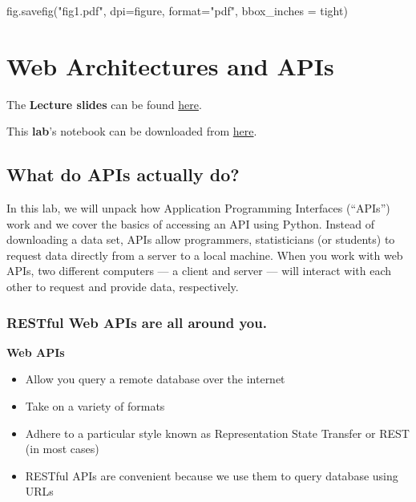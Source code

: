 \documentclass[
  letterpaper,
  DIV=11,
  numbers=noendperiod]{scrreprt}
\newenvironment{Shaded}{\begin{snugshade}}{\end{snugshade}}
\newcommand{\BuiltInTok}[1]{\textcolor[rgb]{0.00,0.23,0.31}{#1}}
\newcommand{\NormalTok}[1]{\textcolor[rgb]{0.00,0.23,0.31}{#1}}
\newcommand{\OperatorTok}[1]{\textcolor[rgb]{0.37,0.37,0.37}{#1}}
\newcommand{\StringTok}[1]{\textcolor[rgb]{0.13,0.47,0.30}{#1}}
\providecommand{\tightlist}{%
  \setlength{\itemsep}{0pt}\setlength{\parskip}{0pt}}\usepackage{longtable,booktabs,array}
\begin{document}
\begin{Shaded}
\begin{Highlighting}[]
\NormalTok{fig.savefig(}\StringTok{"fig1.pdf"}\NormalTok{, dpi}\OperatorTok{=}\StringTok{\textquotesingle{}figure\textquotesingle{}}\NormalTok{, }\BuiltInTok{format}\OperatorTok{=}\StringTok{"pdf"}\NormalTok{, bbox\_inches }\OperatorTok{=} \StringTok{\textquotesingle{}tight\textquotesingle{}}\NormalTok{)}
\end{Highlighting}
\end{Shaded}


\hypertarget{web-architectures-and-apis}{%
\chapter{Web Architectures and APIs}\label{web-architectures-and-apis}}

The \textbf{Lecture slides} can be found
\href{https://github.com/GDSL-UL/wma/raw/main/lectures/w03.pdf}{here}.

This \textbf{lab}'s notebook can be downloaded from
\href{https://github.com/GDSL-UL/wma/blob/main/labs/w03_webArch.ipynb}{here}.

\hypertarget{what-do-apis-actually-do}{%
\section{What do APIs actually do?}\label{what-do-apis-actually-do}}

In this lab, we will unpack how Application Programming Interfaces
(``APIs'') work and we cover the basics of accessing an API using
Python. Instead of downloading a data set, APIs allow programmers,
statisticians (or students) to request data directly from a server to a
local machine. When you work with web APIs, two different computers ---
a client and server --- will interact with each other to request and
provide data, respectively.

\hypertarget{restful-web-apis-are-all-around-you.}{%
\subsection{RESTful Web APIs are all around
you.}\label{restful-web-apis-are-all-around-you.}}

\textbf{Web APIs}

\begin{itemize}
\tightlist
\item
  Allow you query a remote database over the internet
\item
  Take on a variety of formats
\item
  Adhere to a particular style known as Representation State Transfer or
  REST (in most cases)
\item
  RESTful APIs are convenient because we use them to query database
  using URLs
\end{itemize}
\end{document}
